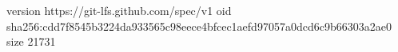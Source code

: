version https://git-lfs.github.com/spec/v1
oid sha256:cdd7f8545b3224da933565c98eece4bfcec1aefd97057a0dcd6c9b66303a2ae0
size 21731
